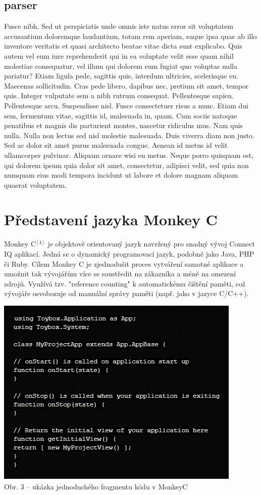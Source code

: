 \documentclass[czech,master,dept460,male,cpp,cpdeclaration]{diploma}
\begin{document}
\subsection{parser}
Fusce nibh. Sed ut perspiciatis unde omnis iste natus error sit voluptatem accusantium doloremque laudantium, totam rem aperiam, eaque ipsa quae ab illo inventore veritatis et quasi architecto 
beatae vitae dicta sunt explicabo. Quis autem vel eum iure reprehenderit qui in ea voluptate velit esse quam nihil molestiae consequatur, vel illum qui dolorem eum fugiat quo voluptas nulla pariatur? Etiam ligula pede, sagittis quis, interdum ultricies, scelerisque eu. Maecenas sollicitudin. Cras pede libero, dapibus nec, pretium sit amet, tempor quis. Integer vulputate sem a nibh rutrum consequat. Pellentesque sapien. Pellentesque arcu. Suspendisse nisl. Fusce consectetuer risus a nunc. Etiam dui sem, fermentum vitae, sagittis id, malesuada in, quam. Cum sociis natoque penatibus et magnis dis parturient montes, nascetur ridiculus mus. Nam quis nulla. Nulla non lectus sed nisl molestie malesuada. Duis viverra diam non justo. Sed ac dolor sit amet purus malesuada congue. Aenean id metus id velit ullamcorper pulvinar. Aliquam ornare wisi eu metus. Neque porro quisquam est, qui dolorem ipsum quia dolor sit amet, consectetur, adipisci velit, sed quia non numquam eius modi tempora incidunt ut labore et dolore magnam aliquam quaerat voluptatem.


\section{Představení jazyka Monkey C}
Monkey C$^{[4]}$  je objektově orientovaný jazyk navržený pro snadný vývoj Connect IQ aplikací. Jedná se o dynamický programovací jazyk, podobně jako Java, PHP či Ruby. Cílem Monkey C je zjednodušit proces vytváření samotné aplikace a umožnit tak vývojářům více se soustředit na zákazníka a méně na omezení zdrojů. Využívá tzv. "reference counting" k automatickému čištění paměti, což vývojáře osvobozuje od manuální správy paměti (např. jako v jazyce C/C++).
\\
\begin{center}
	\includegraphics{code_snippet}
	\\
	Obr. 3 – ukázka jednoduchého fragmentu kódu v MonkeyC
\end{center}
	
\end{document}
